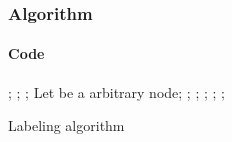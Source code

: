 \begin{frame}
  \frametitle{Algorithm}
  \framesubtitle{Code}
  \begin{algorithm}[H]
    \scriptsize
    \begin{algorithmic}[1]
      \REQUIRE {}
      \STATE {};
      \STATE {};
      \STATE {};
      \label{step:main_while}
        \STATE Let  be a  arbitrary node;
        \label{step:explore_arcs}
          \STATE {};
              \STATE {};
            \ENDIF
          \ENDFOR
          \STATE {};
            \STATE {};
          \ENDIF
        \ENDFOR
        \STATE {};
      \ENDWHILE
    \end{algorithmic}
    \caption{Labeling algorithm}
    \label{alg:seq}
  \end{algorithm}
\end{frame}

